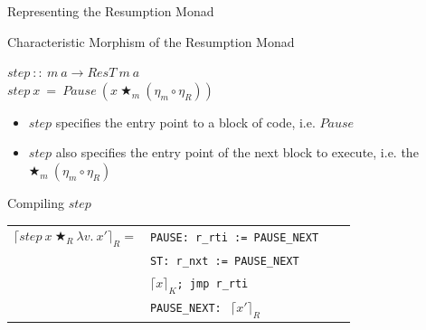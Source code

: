 \documentclass{beamer}
\begin{document}
\begin{frame}{Representing the Resumption Monad}

\begin{structure}{Characteristic Morphism of the Resumption Monad}

\begin{center}

\begin{onlinebox}{6.25cm}

\begin{flushleft}
$step\ ::\ m\ a \rightarrow ResT\ m\ a$\\
$step\ x\ =\ Pause\ (x\ \bigstar_m\ (\eta_m \circ \eta_R))$\\
\end{flushleft}

\end{onlinebox}

\end{center}

\end{structure}

\begin{itemize}

\item{$step$ specifies the entry point to a block of code, i.e. $Pause$}

\item{$step$ also specifies the entry point of the next block to execute, i.e. the $\bigstar_m\ (\eta_m \circ \eta_R)$}

\end{itemize}

\begin{structure}{Compiling $step$}

\begin{center}
\begin{onlinebox}{10cm}
\begin{flushleft}

\begin{tabular}[t]{llll}

$\lceil step\ x\ \bigstar_R\ \lambda v.\ x\prime \rceil_R =$&\texttt{PAUSE: r\_rti := PAUSE\_NEXT}\\
&\texttt{ST: r\_nxt := PAUSE\_NEXT}\\
&$\lceil x \rceil_K$\texttt{; jmp r\_rti}\\
&\texttt{PAUSE\_NEXT: }$\ \lceil x\prime \rceil_R$\\


\end{tabular}


\end{flushleft}
\end{onlinebox}
\end{center}
\end{structure}
\end{frame}
\end{document}
